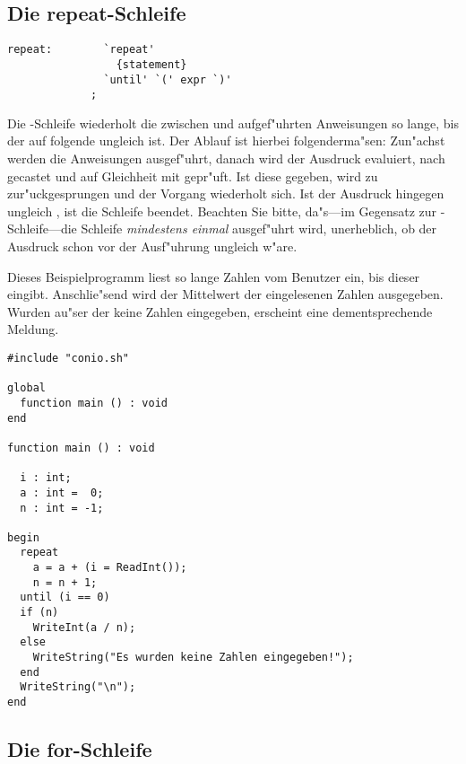 \subsection{Die repeat-Schleife}

\begin{verbatim}
repeat:        `repeat'
                 {statement}
               `until' `(' expr `)'
             ;
\end{verbatim}

Die -Schleife wiederholt die zwischen  und
 aufgef"uhrten Anweisungen so lange, bis der auf
 folgende  ungleich  ist. Der Ablauf ist
hierbei folgenderma"sen: Zun"achst werden die Anweisungen
ausgef"uhrt, danach wird der Ausdruck evaluiert, nach \tint\
gecastet und auf
Gleichheit mit  gepr"uft. Ist diese gegeben, wird zu
 zur"uckgesprungen und der Vorgang wiederholt sich.
Ist der Ausdruck hingegen ungleich , ist die Schleife
beendet. Beachten Sie bitte, da"s---im Gegensatz zur
-Schleife---die Schleife {\em mindestens einmal}
ausgef"uhrt wird, unerheblich, ob der Ausdruck schon vor der
Ausf"uhrung ungleich  w"are.

\example
Dieses Beispielprogramm liest so lange Zahlen vom Benutzer ein,
bis dieser  eingibt. Anschlie"send wird der Mittelwert der
eingelesenen Zahlen ausgegeben. Wurden au"ser der \fu{0} keine
Zahlen eingegeben, erscheint eine dementsprechende Meldung.
    
\begin{verbatim}
#include "conio.sh"

global
  function main () : void
end

function main () : void

  i : int;
  a : int =  0;
  n : int = -1;

begin
  repeat
    a = a + (i = ReadInt());
    n = n + 1;
  until (i == 0)
  if (n)
    WriteInt(a / n);
  else
    WriteString("Es wurden keine Zahlen eingegeben!");
  end
  WriteString("\n");
end
\end{verbatim}

\subsection{Die for-Schleife}

